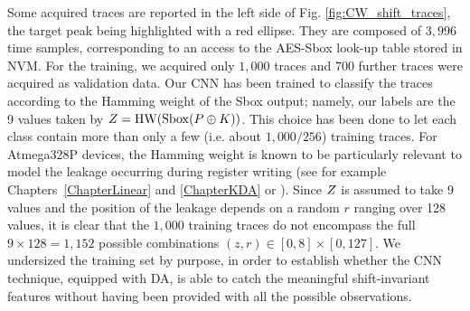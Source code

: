 Some acquired traces are reported in the left side of Fig. \ref{fig:CW_shift_traces}, the target peak being highlighted with a red ellipse. They are composed of $3,996$ time samples, corresponding to an access to the AES-Sbox look-up table stored in NVM. For the training, we acquired only $1,000$ traces and 700 further traces were acquired as validation data. Our CNN has been trained to classify the traces according to the Hamming weight of the Sbox output; namely, our labels are the 9 values taken by $Z = \mathrm{HW}(\mathrm{Sbox}(P\oplus K))$. This choice has been done to let each class contain more than only a few (i.e. about $1,000/256$) training traces.
For Atmega328P devices, the Hamming weight is known to be particularly relevant to model the leakage occurring during register writing (see for example Chapters~\ref{ChapterLinear} and \ref{ChapterKDA} or \cite{BelaidCFGKP15}). Since $Z$ is assumed to take 9 values and the position of the leakage depends on a random $r$ ranging over 128 values, it is clear that the $1,000$ training traces do not encompass the full $9 \times 128=1,152$ possible combinations $(z,r)\in [0,8]\times[0,127]$. We undersized the training set by purpose, in order to establish whether the CNN technique, equipped with DA, is able to catch the meaningful shift-invariant features without having been provided with all the possible observations.


